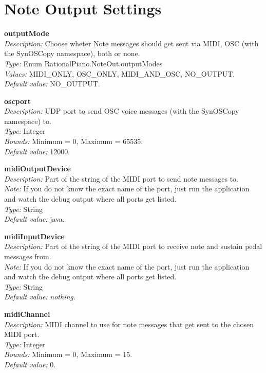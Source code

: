 \documentclass[12pt,a4paper,titlepage,oneside]{report}
\begin{document}
\section{Note Output Settings}

\noindent
\textbf{outputMode} \\
\emph{Description:} Choose wheter Note messages should get sent via MIDI, OSC (with the SynOSCopy namespace), both or none. \\
\emph{Type:} Enum RationalPiano.NoteOut.outputModes  \\
\emph{Values:} MIDI\_ONLY, OSC\_ONLY, MIDI\_AND\_OSC, NO\_OUTPUT. \\
\emph{Default value:} NO\_OUTPUT.

\noindent
\textbf{oscport} \\
\emph{Description:} UDP port to send OSC voice messages (with the SynOSCopy namespace) to. \\
\emph{Type:} Integer \\
\emph{Bounds:} Minimum = 0, Maximum = 65535. \\
\emph{Default value:} 12000.

\noindent
\textbf{midiOutputDevice} \\
\emph{Description:} Part of the string of the MIDI port to send note messages to. \\
\emph{Note:} If you do not know the exact name of the port, just run the application and watch the debug output where all ports get listed. \\
\emph{Type:} String \\
\emph{Default value:} java.

\noindent
\textbf{midiInputDevice} \\
\emph{Description:} Part of the string of the MIDI port to receive note and sustain pedal messages from. \\
\emph{Note:} If you do not know the exact name of the port, just run the application and watch the debug output where all ports get listed. \\
\emph{Type:} String \\
\emph{Default value:} \emph{nothing}.

\noindent
\textbf{midiChannel} \\
\emph{Description:} MIDI channel to use for note messages that get sent to the chosen MIDI port. \\
\emph{Type:} Integer \\
\emph{Bounds:} Minimum = 0, Maximum = 15. \\
\emph{Default value:} 0.
\end{document}
